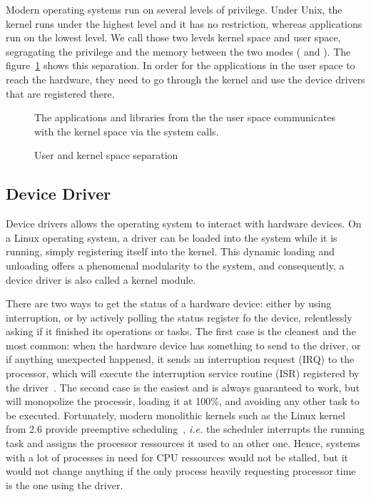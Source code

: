 

Modern operating systems run on several levels of privilege.
Under Unix, the kernel runs under the highest level and it has no restriction, whereas applications run on the lowest level.
We call those two levels kernel space and user space, segragating the privilege and the memory between the two modes (\citet{tanenbaum2014} and \citet[chap. 2]{Corbet:2005:LDD:1209083}).
The figure~\ref{fig:user-kernel} shows this separation.
In order for the applications in the user space to reach the hardware, they need to go through the kernel and use the device drivers that are registered there.

\begin{figure}[ht]
\center

\caption{User and kernel space separation}{The applications and libraries from the the user space communicates with the kernel space via the system calls.}
\label{fig:user-kernel}
\end{figure}

\subsection{Device Driver}\label{sec:theory-driver}
Device drivers allows the operating system to interact with hardware devices.
On a Linux operating system, a driver can be loaded into the system while it is running, simply registering itself into the kernel.
This dynamic loading and unloading offers a phenomenal modularity to the system, and consequently, a device driver is also called a kernel module.\newline{}

There are two ways to get the status of a hardware device: either by using interruption, or by actively polling the status register fo the device, relentlessly asking if it finished its operations or tasks.
The first case is the cleanest and the most common: when the hardware device has something to send to the driver, or if anything unexpected happened, it sends an interruption request (IRQ) to the processor, which will execute the interruption service routine (ISR) registered by the driver~\citep[chap. 10]{Corbet:2005:LDD:1209083}.
The second case is the easiest and is always guaranteed to work, but will monopolize the processir, loading it at 100\%, and avoiding any other task to be executed.
Fortunately, modern monolithic kernels such as the Linux kernel from 2.6 provide preemptive scheduling~\cite{Santhanam2003}, \textit{i.e.} the scheduler interrupts the running task and assigns the processor ressources it used to an other one.
Hence, systems with a lot of processes in need for CPU ressources would not be stalled, but it would not change anything if the only process heavily requesting processor time is the one using the driver.\newline{}

